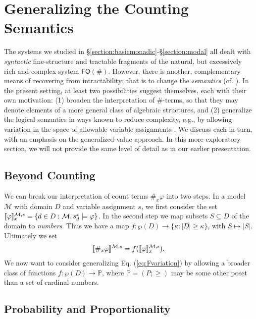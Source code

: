 \documentclass[12pt,oneside,reqno]{amsart}
\newcommand{\semantics}[1]{[\![\mbox{\em $ #1 $\/}]\!]}
\theoremstyle{definition}
\begin{document}
\section{Generalizing the Counting Semantics} \label{section:beyond} The systems we studied in \S\ref{section:basicmonadic}-\S\ref{section:modal} all dealt with \emph{syntactic} fine-structure and tractable fragments of the natural, but excessively rich and complex system $\mathsf{FO}(\#)$. However, there is another, complementary means of recovering from intractability; that is to change the \emph{semantics} (cf. \citealt{vanBenthem2005}). In the present setting, at least two possibilities suggest themselves, each with their own motivation: (1) broaden the interpretation of $\#$-terms, so that they may denote elements of a more general class of algebraic structures, and (2) generalize the logical semantics in ways known to reduce complexity, e.g., by allowing variation in the space of allowable variable assignments \citep{Nemeti}. We discuss each in turn, with an emphasis on the generalized-value approach. In this more exploratory section, we will not provide the same level of detail as in our earlier presentation. \vspace{-0.5ex}


\subsection{Beyond Counting} We can break our  interpretation of count terms $\#_x\varphi$ into two steps. In a model $\mathcal{M}$ with domain $D$ and variable assignment $s$, we first consider the set $\semantics{\varphi}^{\mathcal{M},s}_x =\{d \in D: \mathcal{M}, s^x_d \models \varphi\}$. In the second step we map subsets $S \subseteq D$ of the domain to \emph{numbers}. Thus we have a map $f:\wp{(D)} \rightarrow  \{\kappa: |D| \geq \kappa\}$, with $S \mapsto |S|$. Ultimately we set\vspace{0.5ex} \begin{equation} \label{eq:Fvariation} \semantics{\#_x\varphi}^{\mathcal{M},s} = f(\semantics{\varphi}^{\mathcal{M},s}_x). \end{equation}\vspace{0.5ex}
We now want to consider generalizing Eq. (\ref{eq:Fvariation}) by allowing a broader class of functions $f:\wp{(D)} \rightarrow \mathbb{P}$, where $\mathbb{P} = (P;\geq)$ may be some other poset than a set of cardinal numbers. 

\subsection{Probability and Proportionality} \label{section:probprop}
\end{document}
